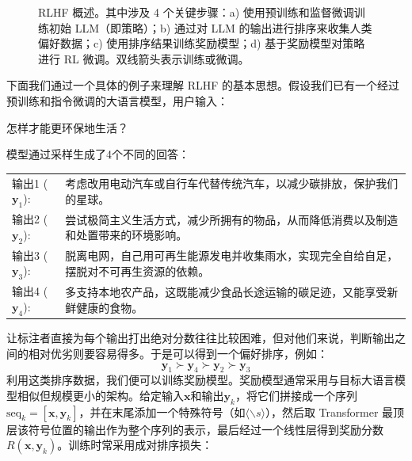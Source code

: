 \begin{figure}[!t]
\centering

\caption{RLHF 概述。其中涉及 4 个关键步骤：a) 使用预训练和监督微调训练初始 LLM（即策略）；b) 通过对 LLM 的输出进行排序来收集人类偏好数据；c) 使用排序结果训练奖励模型；d) 基于奖励模型对策略进行 RL 微调。双线箭头表示训练或微调。}
\label{fig:llm-rlhf-overview}
\end{figure}

下面我们通过一个具体的例子来理解 RLHF 的基本思想。假设我们已有一个经过预训练和指令微调的大语言模型，用户输入：
\vspace{0.5em}
\begin{tcolorbox}
\begin{center}
\parbox{0.9\textwidth}
{
怎样才能更环保地生活？
}
\end{center}
\end{tcolorbox}
\vspace{0.5em}
模型通过采样生成了4个不同的回答：
\vspace{0.5em}
\begin{tcolorbox}
\begin{center}
\setlength{\tabcolsep}{4pt}
\begin{tabular}{p{} p{}}
输出1 ($\mathbf{y}_1$): & 考虑改用电动汽车或自行车代替传统汽车，以减少碳排放，保护我们的星球。 \\
输出2 ($\mathbf{y}_2$): & 尝试极简主义生活方式，减少所拥有的物品，从而降低消费以及制造和处置带来的环境影响。 \\
输出3 ($\mathbf{y}_3$): & 脱离电网，自己用可再生能源发电并收集雨水，实现完全自给自足，摆脱对不可再生资源的依赖。 \\
输出4 ($\mathbf{y}_4$): & 多支持本地农产品，这既能减少食品长途运输的碳足迹，又能享受新鲜健康的食物。
\end{tabular}
\end{center}
\end{tcolorbox}
\vspace{0.5em}
让标注者直接为每个输出打出绝对分数往往比较困难，但对他们来说，判断输出之间的相对优劣则要容易得多。于是可以得到一个偏好排序，例如：
\begin{equation}
\mathbf{y}_1 \succ \mathbf{y}_4 \succ \mathbf{y}_2 \succ \mathbf{y}_3 \nonumber
\end{equation}
利用这类排序数据，我们便可以训练奖励模型。奖励模型通常采用与目标大语言模型相似但规模更小的架构。给定输入$\mathbf{x}$和输出$\mathbf{y}_k$，将它们拼接成一个序列$\mathrm{seq}_k = [\mathbf{x},\mathbf{y}_k]$，并在末尾添加一个特殊符号（如$\langle \backslash s \rangle$），然后取 Transformer 最顶层该符号位置的输出作为整个序列的表示，最后经过一个线性层得到奖励分数$R(\mathbf{x},\mathbf{y}_k)$。训练时常采用成对排序损失：
